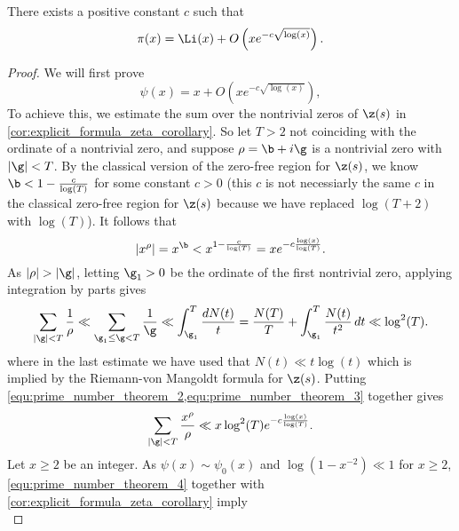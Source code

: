       \begin{proposition}
        There exists a positive co\-nstant $c$ such that
        \[
          \pi(x) = \Li(x)+O\left(xe^{-c\sqrt{\log(x)}}\right).
        \]
      \end{proposition}
      \begin{proof}
        We will first prove
        \begin{equation}\label{equ:prime_number_theorem_1}
          \psi(x) = x+O\left(xe^{-c\sqrt{\log(x)}}\right),
        \end{equation}
        To achieve this, we estimate the sum over the nontrivial zeros of $\z(s)$ in \cref{cor:explicit_formula_zeta_corollary}. So let $T > 2$ not coinciding with the ordinate of a nontrivial zero, and suppose $\rho = \b+i\g$ is a nontrivial zero with $|\g| < T$. By the classical version of the zero-free region for $\z(s)$, we know $\b < 1-\frac{c}{\log(T)}$ for some constant $c > 0$ (this $c$ is not necessiarly the same $c$ in the classical zero-free region for $\z(s)$ because we have replaced $\log(T+2)$ with $\log(T)$). It follows that
        \begin{equation}\label{equ:prime_number_theorem_2}
          |x^{\rho}| = x^{\b} < x^{1-\frac{c}{\log(T)}} = xe^{-c\frac{\log(x)}{\log(T)}}.
        \end{equation}
        As $|\rho| > |\g|$, letting $\g_{1} > 0$ be the ordinate of the first nontrivial zero, applying integration by parts gives
        \begin{equation}\label{equ:prime_number_theorem_3}
          \sum_{|\g| < T}\frac{1}{\rho} \ll \sum_{\g_{1} \le \g < T}\frac{1}{\g} \ll \int_{\g_{1}}^{T}\frac{dN(t)}{t} = \frac{N(T)}{T}+\int_{\g_{1}}^{T}\frac{N(t)}{t^{2}}\,dt \ll \log^{2}(T).
        \end{equation}
        where in the last estimate we have used that $N(t) \ll t\log(t)$ which is implied by the Riemann-von Mangoldt formula for $\z(s)$. Putting \cref{equ:prime_number_theorem_2,equ:prime_number_theorem_3} together gives
        \begin{equation}\label{equ:prime_number_theorem_4}
          \sum_{|\g| < T}\frac{x^{\rho}}{\rho} \ll x\log^{2}(T)e^{-c\frac{\log(x)}{\log(T)}}.
        \end{equation}
        Let $x \ge 2$ be an integer. As $\psi(x) \sim \psi_{0}(x)$ and $\log(1-x^{-2}) \ll 1$ for $x \ge 2$, \cref{equ:prime_number_theorem_4} together with \cref{cor:explicit_formula_zeta_corollary} imply
        \begin{equation}\label{equ:prime_number_theorem_5}

\end{equation}
\end{proof}
